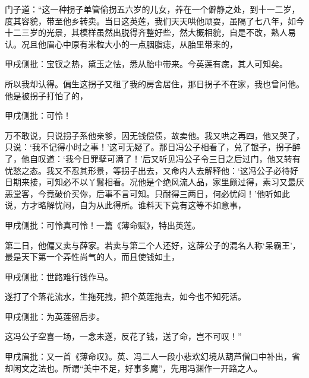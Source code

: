 \begin{parag}
    门子道：“这一种拐子单管偷拐五六岁的儿女，养在一个僻静之处，到十一二岁，度其容貌，带至他乡转卖。当日这英莲，我们天天哄他顽耍，虽隔了七八年，如今十二三岁的光景，其模样虽然出脱得齐整好些，然大概相貌，自是不改，熟人易认。况且他眉心中原有米粒大小的一点胭脂痣，从胎里带来的，\begin{note}甲戌侧批：宝钗之热，黛玉之怯，悉从胎中带来。今英莲有痣，其人可知矣。\end{note}所以我却认得。偏生这拐子又租了我的房舍居住，那日拐子不在家，我也曾问他。他是被拐子打怕了的，\begin{note}甲戌侧批：可怜！\end{note}万不敢说，只说拐子系他亲爹，因无钱偿债，故卖他。我又哄之再四，他又哭了，只说：‘我不记得小时之事！’这可无疑了。那日冯公子相看了，兑了银子，拐子醉了，他自叹道：‘我今日罪孽可满了！’后又听见冯公子令三日之后过门，他又转有忧愁之态。我又不忍其形景，等拐子出去，又命内人去解释他：‘这冯公子必待好日期来接，可知必不以丫鬟相看。况他是个绝风流人品，家里颇过得，素习又最厌恶堂客，今竟破价买你，后事不言可知。只耐得三两日，何必忧闷！’他听如此说，方才略解忧闷，自为从此得所。谁料天下竟有这等不如意事，\begin{note}甲戌侧批：可怜真可怜！一篇《薄命赋》，特出英莲。\end{note}第二日，他偏又卖与薛家。若卖与第二个人还好，这薛公子的混名人称‘呆霸王’，最是天下第一个弄性尚气的人，而且使钱如土，\begin{note}甲戌侧批：世路难行钱作马。\end{note}遂打了个落花流水，生拖死拽，把个英莲拖去，如今也不知死活。\begin{note}甲戌侧批：为英莲留后步。\end{note}这冯公子空喜一场，一念未遂，反花了钱，送了命，岂不可叹！”\begin{note}甲戌眉批：又一首《薄命叹》。英、冯二人一段小悲欢幻境从葫芦僧口中补出，省却闲文之法也。所谓“美中不足，好事多魔”，先用冯渊作一开路之人。\end{note}
\end{parag}


